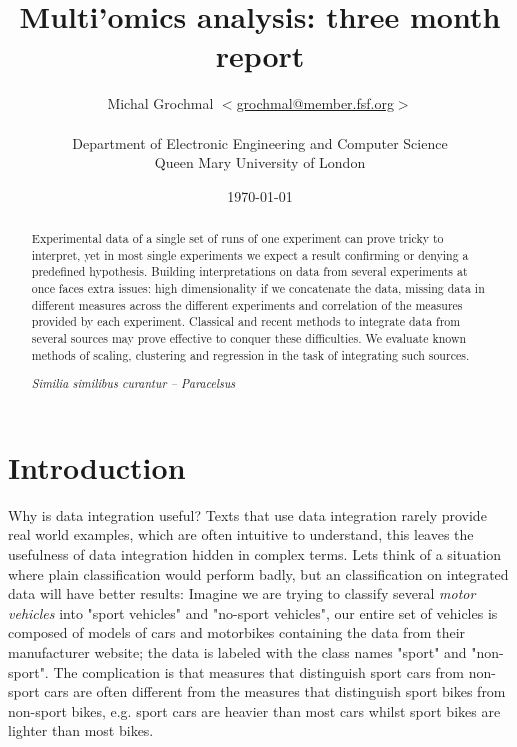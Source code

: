 \documentclass[11pt,a4paper,twoside,openright]{report}
\title{Multi'omics analysis: three month report}
\author{Michal Grochmal
  $<$\href{mailto:grochmal@member.fsf.org}{grochmal@member.fsf.org}$>$\\
  \\
  Department of Electronic Engineering and Computer Science\\
  Queen Mary University of London
}
\date{\today}
\begin{document}
\maketitle

\newpage
\null
\thispagestyle{empty}
\newpage

\pagestyle{fancy}
\lhead{}
\rhead{}

\begin{abstract}
Experimental data of a single set of runs of one experiment can prove tricky to
interpret, yet in most single experiments we expect a result confirming or
denying a predefined hypothesis.  Building interpretations on data from several
experiments at once faces extra issues: high dimensionality if we concatenate
the data, missing data in different measures across the different experiments
and correlation of the measures provided by each experiment.  Classical and
recent methods to integrate data from several sources may prove effective to
conquer these difficulties.  We evaluate known methods of scaling, clustering
and regression in the task of integrating such sources.
\begin{flushright}
\emph{Similia similibus curantur -- Paracelsus}
\end{flushright}
\end{abstract}

\newpage
\null
\thispagestyle{empty}
\newpage

\newpage
\setcounter{page}{1}

\clearpage{\pagestyle{empty}\cleardoublepage}
\chapter{Introduction}

Why is data integration useful?  Texts that use data integration rarely provide
real world examples, which are often intuitive to understand, this leaves the
usefulness of data integration hidden in complex terms.  Lets think of a
situation where plain classification would perform badly, but an classification
on integrated data will have better results:  Imagine we are trying to classify
several \emph{motor vehicles} into "sport vehicles" and "no-sport vehicles",
our entire set of vehicles is composed of models of cars and motorbikes
containing the data from their manufacturer website; the data is labeled with
the class names "sport" and "non-sport".  The complication is that measures
that distinguish sport cars from non-sport cars are often different from the
measures that distinguish sport bikes from non-sport bikes, e.g. sport cars are
heavier than most cars whilst sport bikes are lighter than most bikes.
\end{document}
